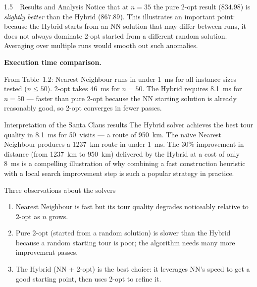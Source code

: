 \documentclass[aspectratio=169,10pt]{beamer}
\begin{document}
\begin{frame}[allowframebreaks]{1.5~~Results and Analysis}
  Notice that at $n = 35$ the pure 2-opt result ($834.98$) is
  \emph{slightly better} than the Hybrid ($867.89$).  This illustrates
  an important point: because the Hybrid starts from an NN solution
  that may differ between runs, it does not always dominate 2-opt
  started from a different random solution.  Averaging over multiple
  runs would smooth out such anomalies.

\framebreak

  \textbf{Execution time comparison.}

  From Table~1.2: Nearest Neighbour runs in under 1~ms for all instance
  sizes tested ($n \leq 50$).  2-opt takes 46~ms for $n = 50$.  The
  Hybrid requires 8.1~ms for $n = 50$ --- faster than pure 2-opt because
  the NN starting solution is already reasonably good, so 2-opt converges
  in fewer passes.

  \medskip
  \begin{exampleblock}{Interpretation of the Santa Claus results}
    The Hybrid solver achieves the best tour quality in 8.1~ms for
    50~visits --- a route of 950~km.  The na\"{\i}ve Nearest Neighbour
    produces a 1237~km route in under 1~ms.  The 30\% improvement in
    distance (from 1237~km to 950~km) delivered by the Hybrid at a cost
    of only 8~ms is a compelling illustration of why combining a fast
    construction heuristic with a local search improvement step is such
    a popular strategy in practice.
  \end{exampleblock}

  \begin{alertblock}{Three observations about the solvers}
    \begin{enumerate}
      \item Nearest Neighbour is fast but its tour quality degrades
        noticeably relative to 2-opt as $n$ grows.
      \item Pure 2-opt (started from a random solution) is slower than
        the Hybrid because a random starting tour is poor; the algorithm
        needs many more improvement passes.
      \item The Hybrid (NN + 2-opt) is the best choice: it leverages NN's
        speed to get a good starting point, then uses 2-opt to refine it.
    \end{enumerate}
  \end{alertblock}

\end{frame}

\end{document}
